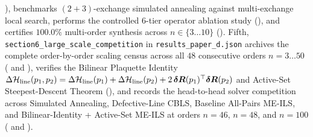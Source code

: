 \cite{kuhn1955hungarian,munkres1957algorithms}), benchmarks $(2+3)$-exchange simulated annealing against multi-exchange local search, performs the controlled $6$-tier operator ablation study (), and certifies $100.0\%$ multi-order synthesis across $n \in \{3\dots 10\}$ (). Fifth, \texttt{section6\_large\_scale\_competition} in \texttt{results\_paper\_d.json} archives the complete order-by-order scaling census across all $48$ consecutive orders $n = 3\dots 50$ ( and ), verifies the Bilinear Plaquette Identity $\Delta\mathcal{H}_{\mathrm{line}}(p_1, p_2) = \Delta\mathcal{H}_{\mathrm{line}}(p_1) + \Delta\mathcal{H}_{\mathrm{line}}(p_2) + 2\,\boldsymbol{\delta R}(p_1)^\top \boldsymbol{\delta R}(p_2)$ and Active-Set Steepest-Descent Theorem (), and records the head-to-head solver competition across Simulated Annealing, Defective-Line CBLS, Baseline All-Pairs ME-ILS, and Bilinear-Identity + Active-Set ME-ILS at orders $n = 46$, $n = 48$, and $n = 100$ ( and ).

